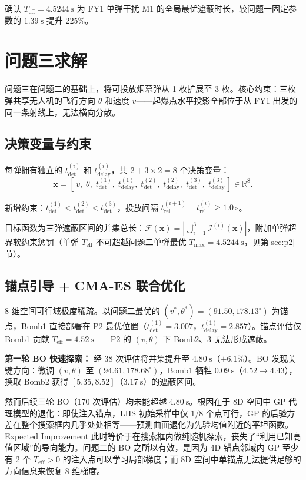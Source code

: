 \documentclass{ctexart}
\newcommand{\Teff}{T_{\text{eff}}}
\begin{document}
确认 $T_{\text{eff}} = 4.5244\ \mathrm{s}$ 为 FY1 单弹干扰 M1 的全局最优遮蔽时长，较问题一固定参数的 $1.39\ \mathrm{s}$ 提升 $225\%$。

\section{问题三求解}
\label{sec:p3}

问题三在问题二的基础上，将可投放烟幕弹从 1 枚扩展至 3 枚。核心约束：三枚弹共享无人机的飞行方向 $\theta$ 和速度 $v$——起爆点水平投影全部位于从 FY1 出发的同一条射线上，无法横向分散。

\subsection{决策变量与约束}

每弹拥有独立的 $t_{\text{det}}^{(i)}$ 和 $t_{\text{delay}}^{(i)}$，共 $2+3\times2=8$ 个决策变量：
\[
\mathbf{x} = [\,v,\; \theta,\; t_{\text{det}}^{(1)},\; t_{\text{delay}}^{(1)},\; t_{\text{det}}^{(2)},\; t_{\text{delay}}^{(2)},\; t_{\text{det}}^{(3)},\; t_{\text{delay}}^{(3)}\,] \in \mathbb{R}^8.
\]

新增约束：$t_{\text{det}}^{(1)} < t_{\text{det}}^{(2)} < t_{\text{det}}^{(3)}$，投放间隔 $t_{\text{rel}}^{(i+1)} - t_{\text{rel}}^{(i)} \geq 1.0\ \mathrm{s}$。

目标函数为三弹遮蔽区间的并集总长：$\mathcal{F}(\mathbf{x}) = |\bigcup_{i=1}^3 \mathcal{I}^{(i)}(\mathbf{x})|$，附加单弹超界软约束惩罚（单弹 $T_{\text{eff}}$ 不可超越问题二单弹最优 $T_{\max}=4.5244\ \mathrm{s}$，见第\ref{sec:p2}节）。

\subsection{锚点引导 + CMA-ES 联合优化}

8 维空间可行域极度稀疏。以问题二最优的 $(v^*,\theta^*)=(91.50, 178.13^\circ)$ 为锚点，Bomb1 直接部署在 P2 最优位置（$t_{\text{det}}^{(1)}=3.007$，$t_{\text{delay}}^{(1)}=2.857$）。锚点评估仅 Bomb1 贡献 $T_{\text{eff}}=4.52\ \mathrm{s}$——P2 的 $(v,\theta)$ 下 Bomb2、3 无法形成遮蔽。

\textbf{第一轮 BO 快速探索：} 经 38 次评估将并集提升至 $4.80\ \mathrm{s}$（$+6.1\%$）。BO 发现关键方向：微调 $(v,\theta)$ 至 $(94.61, 178.68^\circ)$，Bomb1 牺牲 $0.09\ \mathrm{s}$（$4.52 \to 4.43$），换取 Bomb2 获得 $[5.35,8.52]$（$3.17\ \mathrm{s}$）的遮蔽区间。

然而后续三轮 BO（170 次评估）均未能超越 $4.80\ \mathrm{s}$。根因在于 8D 空间中 GP 代理模型的退化：即使注入锚点，LHS 初始采样中仅 $1/8$ 个点可行，GP 的后验方差在整个搜索框内几乎处处相等——预测曲面退化为先验均值附近的平坦函数。Expected Improvement 此时等价于在搜索框内做纯随机探索，丧失了``利用已知高值区域''的导向能力。问题二的 BO 之所以有效，是因为 4D 锚点邻域内 GP 至少有 2 个 $\Teff>0$ 的注入点可以学习局部梯度；而 8D 空间中单锚点无法提供足够的方向信息来恢复 8 维梯度。
\end{document}
